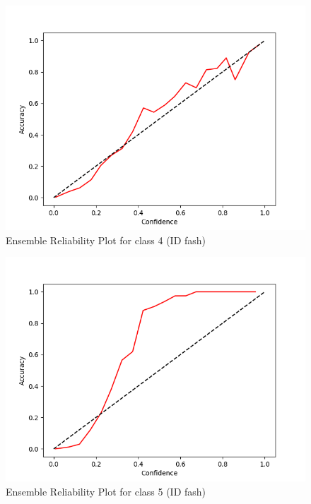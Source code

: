 \documentclass[11pt]{article}
\begin{document}
\begin{figure}[htbp]
\centering
\includegraphics[width=.9\linewidth]{./ens_fash_rel_4.png}
\caption{\label{fig:org11503c5}
Ensemble Reliability Plot for class 4 (ID fash)}
\end{figure}

\begin{figure}[htbp]
\centering
\includegraphics[width=.9\linewidth]{./ens_fash_rel_5.png}
\caption{\label{fig:orgaf3af93}
Ensemble Reliability Plot for class 5 (ID fash)}
\end{figure}
\end{document}
